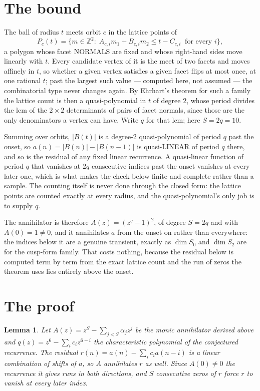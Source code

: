 \documentclass[11pt,a4paper]{article}
\theoremstyle{plain}
\newtheorem{lemma}[theorem]{Lemma}
\theoremstyle{definition}
\begin{document}
\section{The bound}

The ball of radius $t$ meets orbit $c$ in the lattice points of
\[
P_c(t)=\{m\in\mathbb{Z}^2:\;A_{c,i}m_1+B_{c,i}m_2\le t-C_{c,i}\ \text{ for every } i\},
\]
a polygon whose facet NORMALS are fixed and whose right-hand sides move linearly with $t$.
Every candidate vertex of it is the meet of two facets and moves affinely in $t$, so whether a
given vertex satisfies a given facet flips at most once, at one rational $t$; past the largest
such value --- computed here, not assumed --- the combinatorial type never changes again. By
Ehrhart's theorem for such a family the lattice count is then a quasi-polynomial in $t$ of
degree $2$, whose period divides the lcm of the $2\times2$ determinants of pairs of facet
normals, since those are the only denominators a vertex can have. Write $q$ for that lcm;
here $S=2q=10$.

Summing over orbits, $|B(t)|$ is a degree-$2$ quasi-polynomial of period $q$ past the onset,
so $a(n)=|B(n)|-|B(n-1)|$ is quasi-LINEAR of period $q$ there, and so is the residual of any
fixed linear recurrence. A quasi-linear function of period $q$ that vanishes at $2q$
consecutive indices past the onset vanishes at every later one, which is what makes the check
below finite and complete rather than a sample. The counting itself is never done through the
closed form: the lattice points are counted exactly at every radius, and the quasi-polynomial's
only job is to supply $q$.

The annihilator is therefore $A(z)=(z^{q}-1)^2$, of degree $S=2q$ and with $A(0)=1\ne0$, and
it annihilates $a$ from the onset on rather than everywhere: the indices below it are a
genuine transient, exactly as $\dim S_0$ and $\dim S_2$ are for the cusp-form family. That
costs nothing, because the residual below is computed term by term from the exact lattice
count and the run of zeros the theorem uses lies entirely above the onset.

\section{The proof}

\begin{lemma}\label{lem:crit}
Let $A(z)=z^S-\sum_{j<S}\alpha_jz^{j}$ be the monic annihilator derived above and
$q(z)=z^{6}-\sum_ic_iz^{6-i}$ the characteristic polynomial of the conjectured
recurrence. The residual $r(n)=a(n)-\sum_ic_ia(n-i)$ is a linear combination of shifts of $a$,
so $A$ annihilates $r$ as well. Since $A(0)\ne0$ the recurrence it gives runs in both
directions, and $S$ consecutive zeros of $r$ force $r$ to vanish at every later index.
\end{lemma}
\end{document}
